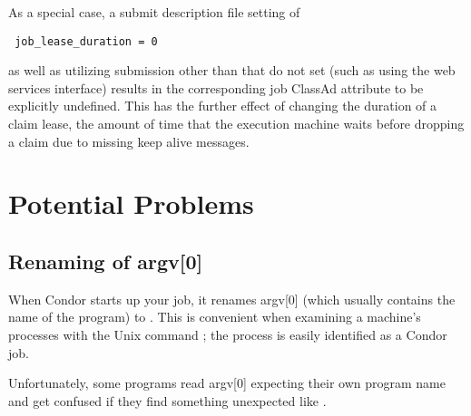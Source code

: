 As a special case, a submit description file setting of
\begin{verbatim}
 job_lease_duration = 0
\end{verbatim}
as well as utilizing submission other than 
that do not set 
(such as using the web services interface)
results in the corresponding job ClassAd attribute to be explicitly
undefined.
This has the further effect of changing the duration of a claim lease,
the amount of time that the execution machine waits before
dropping a claim due to missing keep alive messages.

\section{Potential Problems}

\subsection{\label{sec:renaming-argv}Renaming of argv[0]}

When Condor starts up your job, it renames argv[0] (which usually
contains the name of the program) to .
This is
convenient when examining a machine's processes with the Unix
command ; the process
is easily identified as a Condor job.  

Unfortunately, some programs read argv[0] expecting their own program
name and get confused if they find something unexpected like
.

